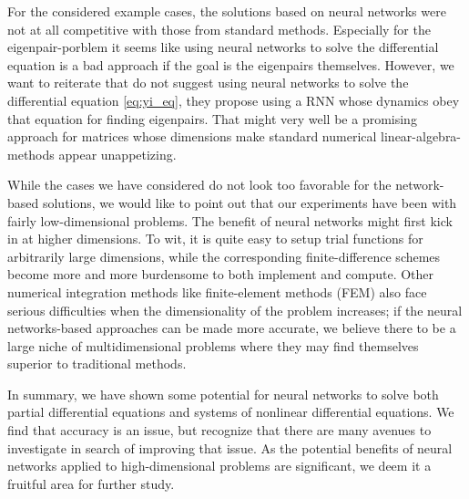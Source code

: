 \documentclass[reprint, english, nofootinbib]{revtex4-2}
\begin{document}
For the considered example cases, the solutions based on neural networks were not at all competitive with those from standard methods. Especially for the  eigenpair-porblem it seems like using neural networks to solve the differential equation is a bad approach if the goal is the eigenpairs themselves. However, we want to reiterate that \cite{Yi_2004} do not suggest using neural networks to solve the differential equation \ref{eq:yi_eq}, they propose using a RNN whose dynamics obey that equation for finding eigenpairs. That might very well be a promising approach for matrices whose dimensions make standard numerical linear-algebra-methods appear unappetizing.

While the cases we have considered do not look too favorable for the network-based solutions, we would like to point out that our experiments have been with fairly low-dimensional problems. The benefit of neural networks might first kick in at higher dimensions. To wit, it is quite easy to setup trial functions for arbitrarily large dimensions, while the corresponding finite-difference schemes become more and more burdensome to both implement and compute. Other numerical integration methods like finite-element methods (FEM) also face serious difficulties when the dimensionality of the problem increases; if the neural networks-based approaches can be made more accurate, we believe there to be a large niche of multidimensional problems where they may find themselves superior to traditional methods.

In summary, we have shown some potential for neural networks to solve both partial differential equations and systems of nonlinear differential equations. We find that accuracy is an issue, but recognize that there are many avenues to investigate in search of improving that issue. As the potential benefits of neural networks applied to high-dimensional problems are significant, we deem it a fruitful area for further study.




\end{document}
